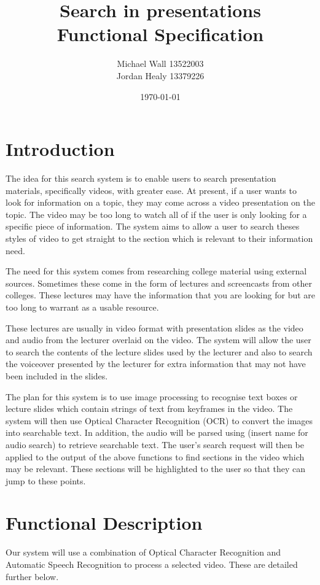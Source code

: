 \documentclass[a4paper,12pt]{article}
\title{Search in presentations\\Functional Specification}
\author{Michael Wall 13522003\\Jordan Healy 13379226}
\date{\today}
\begin{document}
\maketitle
\newpage

\tableofcontents

\newpage

\section{Introduction}
The idea for this search system is to enable users to search presentation materials, specifically videos, with greater ease. At present, if a user wants to look for information on a topic, they may come across a video presentation on the topic. The video may be too long to watch all of if the user is only looking for a specific piece of information. The system aims to allow a user to search theses styles of video to get straight to the section which is relevant to their information need.

The need for this system comes from researching college material using external sources. Sometimes these come in the form of lectures and screencasts from other colleges. These lectures may have the information that you are looking for but are too long to warrant as a usable resource.

These lectures are usually in video format with presentation slides as the video and audio from the lecturer overlaid on the video. The system will allow the user to search the contents of the lecture slides used by the lecturer and also to search the voiceover presented by the lecturer for extra information that may not have been included in the slides.

The plan for this system is to use image processing to recognise text boxes or lecture slides which contain strings of text from keyframes in the video. The system will then use Optical Character Recognition (OCR) to convert the images into searchable text. In addition, the audio will be parsed using (insert name for audio search) to retrieve searchable text. The user’s search request will then be applied to the output of the above functions to find sections in the video which may be relevant. These sections will be highlighted to the user so that they can jump to these points.

\section{Functional Description}
Our system will use a combination of Optical Character Recognition and Automatic Speech Recognition to process a selected video. These are detailed further below.
\end{document}
